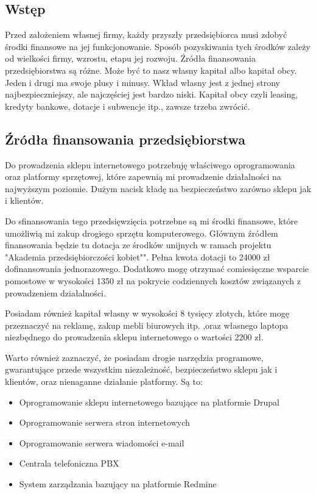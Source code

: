 	\subsection{Wstęp}
		\par Przed założeniem własnej firmy, każdy przyszły przedsiębiorca musi zdobyć środki finansowe na jej funkcjonowanie. Sposób pozyskiwania tych środków zależy od wielkości firmy, wzrostu, etapu jej rozwoju. Źródła finansowania przedsiębiorstwa są różne. Może być to nasz własny kapitał albo kapitał obcy. Jeden i drugi ma swoje plusy i minusy. Wkład własny jest z jednej strony najbezpieczniejszy, ale najczęściej jest bardzo niski. Kapitał obcy czyli leasing, kredyty bankowe, dotacje i subwencje itp., zawsze trzeba zwrócić.
		
	\subsection{Źródła finansowania przedsiębiorstwa}
		\par Do prowadzenia sklepu internetowego potrzebuję właściwego oprogramowania oraz platformy sprzętowej, które zapewnią mi prowadzenie działalności na najwyższym poziomie. Dużym nacisk kładę na bezpieczeństwo zarówno sklepu jak i klientów.
		
		\par Do sfinansowania tego przedsięwzięcia potrzebne są mi środki finansowe, które umożliwią mi zakup drogiego sprzętu komputerowego. Głównym źródłem finansowania będzie tu dotacja ze środków unijnych w ramach projektu "Akademia przedsiębiorczości kobiet"". Pełna kwota dotacji to 24000 zł dofinansowania jednorazowego. Dodatkowo mogę otrzymać comiesięczne wsparcie pomostowe w wysokości 1350 zł na pokrycie codziennych kosztów związanych z prowadzeniem działalności.
		
		\par Posiadam również kapitał własny w wysokości 8 tysięcy złotych, które mogę przeznaczyć na reklamę, zakup mebli biurowych itp. ,oraz własnego laptopa niezbędnego do prowadzenia sklepu internetowego o wartości 2200 zł. 
		
		\par Warto również zaznaczyć, że posiadam drogie narzędzia programowe, gwarantujące przede wszystkim niezależność, bezpieczeństwo sklepu jak i klientów, oraz nienaganne działanie platformy. Są to:
		
		\begin{itemize}
		
			\item Oprogramowanie sklepu internetowego bazujące na platformie Drupal
				
			\item Oprogramowanie serwera stron internetowych
				
			\item Oprogramowanie serwera wiadomości e-mail
				
			\item Centrala telefoniczna PBX
				
			\item System zarządzania bazujący na platformie Redmine
				
				
		\end{itemize}	
				
